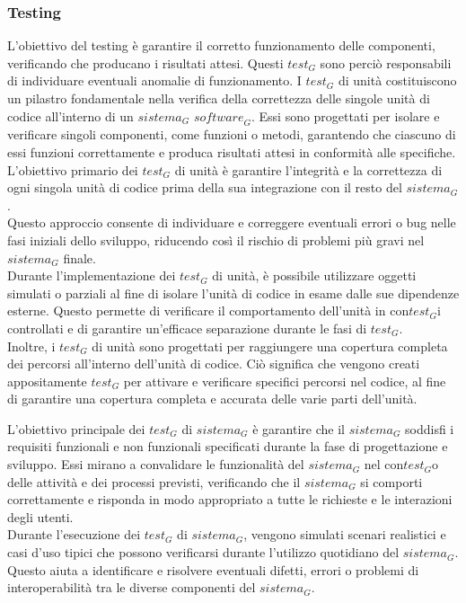 \subsubsection{Testing}
L’obiettivo del testing è garantire il corretto funzionamento delle componenti, verificando che producano i risultati attesi.
Questi $\textit{test}_G$ sono perciò responsabili di individuare eventuali anomalie di funzionamento.
I $\textit{test}_G$ di unità costituiscono un pilastro fondamentale nella verifica della correttezza delle singole unità di codice all'interno di un $\textit{sistema}_G$ $\textit{software}_G$. Essi sono progettati per isolare e verificare singoli componenti, come funzioni o metodi, garantendo che ciascuno di essi funzioni correttamente e produca risultati attesi in conformità alle specifiche.
\\
L'obiettivo primario dei $\textit{test}_G$ di unità è garantire l'integrità e la correttezza di ogni singola unità di codice prima della sua integrazione con il resto del $\textit{sistema}_G$. 
\\Questo approccio consente di individuare e correggere eventuali errori o bug nelle fasi iniziali dello sviluppo, riducendo così il rischio di problemi più gravi nel $\textit{sistema}_G$ finale.
\\
Durante l'implementazione dei $\textit{test}_G$ di unità, è possibile utilizzare oggetti simulati o parziali al fine di isolare l'unità di codice in esame dalle sue dipendenze esterne. Questo permette di verificare il comportamento dell'unità in con$\textit{test}_G$i controllati e di garantire un'efficace separazione durante le fasi di $\textit{test}_G$.
\\
Inoltre, i $\textit{test}_G$ di unità sono progettati per raggiungere una copertura completa dei percorsi all'interno dell'unità di codice. Ciò significa che vengono creati appositamente $\textit{test}_G$ per attivare e verificare specifici percorsi nel codice, al fine di garantire una copertura completa e accurata delle varie parti dell'unità.

L'obiettivo principale dei $\textit{test}_G$ di $\textit{sistema}_G$ è garantire che il $\textit{sistema}_G$ soddisfi i requisiti funzionali e non funzionali specificati durante la fase di progettazione e sviluppo. Essi mirano a convalidare le funzionalità del $\textit{sistema}_G$ nel con$\textit{test}_G$o delle attività e dei processi previsti, verificando che il $\textit{sistema}_G$ si comporti correttamente e risponda in modo appropriato a tutte le richieste e le interazioni degli utenti.
\\
Durante l'esecuzione dei $\textit{test}_G$ di $\textit{sistema}_G$, vengono simulati scenari realistici e casi d'uso tipici che possono verificarsi durante l'utilizzo quotidiano del $\textit{sistema}_G$. 
\\Questo aiuta a identificare e risolvere eventuali difetti, errori o problemi di interoperabilità tra le diverse componenti del $\textit{sistema}_G$.

